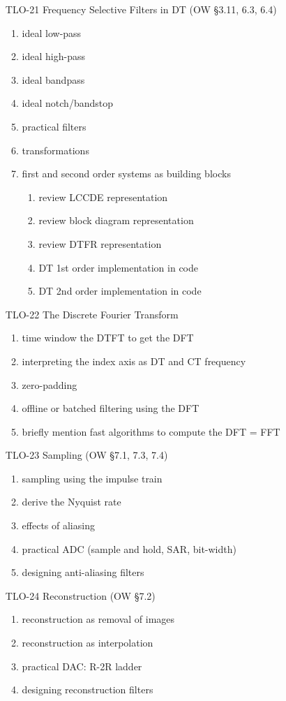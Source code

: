 \begin{enumerate}
\item[TLO-21] Frequency Selective Filters in DT (OW \S 3.11, 6.3, 6.4)
  \begin{enumerate}
  \item ideal low-pass
  \item ideal high-pass
  \item ideal bandpass
  \item ideal notch/bandstop
  \item practical filters
  \item transformations
  \item first and second order systems as building blocks
    \begin{enumerate}
    \item review LCCDE representation
    \item review block diagram representation
    \item review DTFR representation
    \item DT 1st order implementation in code
    \item DT 2nd order implementation in code
    \end{enumerate}
  \end{enumerate}
  
\item[TLO-22] The Discrete Fourier Transform
  \begin{enumerate}
  \item time window the DTFT to get the DFT
  \item interpreting the index axis as DT and CT frequency
  \item zero-padding
  \item offline or batched filtering using the DFT
  \item briefly mention fast algorithms to compute the DFT = FFT
  \end{enumerate}
  
\item[TLO-23] Sampling (OW \S 7.1, 7.3, 7.4)
  \begin{enumerate}
  \item sampling using the impulse train
  \item derive the Nyquist rate
  \item effects of aliasing
  \item practical ADC (sample and hold, SAR, bit-width)
  \item designing anti-aliasing filters
  \end{enumerate}

\item[TLO-24] Reconstruction (OW \S 7.2)
  \begin{enumerate}
  \item reconstruction as removal of images
  \item reconstruction as interpolation
  \item practical DAC: R-2R ladder
  \item designing reconstruction filters
  \end{enumerate}
\end{enumerate}


